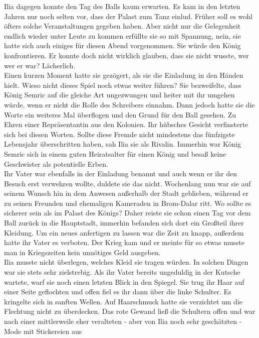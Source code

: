 Ilia dagegen konnte den Tag des Balls kaum erwarten. Es kam in den letzten Jahren nur noch selten 
vor, dass der Palast zum Tanz einlud. Früher soll es wohl öfters solche Veranstaltungen gegeben 
haben. Aber nicht nur die Gelegenheit endlich wieder unter Leute zu kommen erfüllte sie so mit 
Spannung, nein, sie hatte sich auch einiges für diesen Abend vorgenommen. Sie würde den König 
konfrontieren. Er konnte doch nicht wirklich glauben, dass sie nicht wusste, wer wer er war? 
Lächerlich.\\
Einen kurzen Moment hatte sie gezögert, als sie die Einladung in den Händen hielt. Wieso nicht 
dieses Spiel noch etwas weiter führen? Sie bezweifelte, dass König Semric auf die gleiche Art 
ungezwungen und heiter mit ihr umgehen würde, wenn er nicht die Rolle des Schreibers einnahm. Dann 
jedoch hatte sie die Worte ein weiteres Mal überflogen und den Grund für den Ball gesehen. Zu Ehren 
einer Repräsentantin aus den Kolonien. Ihr hübsches Gesicht verfinsterte sich bei diesen Worten. 
Sollte diese Fremde nicht mindestens das fünfzigste Lebensjahr überschritten haben, sah Ilia sie 
als Rivalin. Immerhin war König Semric sich in einem guten Heiratsalter für einen König und besaß 
keine Geschwister als potentielle Erben.\\
Ihr Vater war ebenfalls in der Einladung benannt und auch wenn er ihr den Besuch erst verwehren 
wollte, duldete sie das nicht. Wochenlang nun war sie auf seinem Wunsch hin in dem Anwesen 
außerhalb der Stadt geblieben, während er zu seinen Freunden und ehemaligen Kameraden in Brom-Dalar 
ritt. Wo sollte es sicherer sein als im Palast des Königs? Daher reiste sie schon einen Tag vor dem 
Ball zurück in die Hauptstadt, immerhin befanden sich dort ein Großteil ihrer Kleidung. Um ein 
neues anfertigen zu lassen war die Zeit zu knapp, außerdem hatte ihr Vater es verboten. Der Krieg 
kam und er meinte für so etwas musste man in Kriegszeiten kein unnötiges Geld ausgeben.\\
Ilia musste nicht überlegen, welches Kleid sie tragen würden. In solchen Dingen war sie stets sehr 
zielstrebig. Als ihr Vater bereits ungeduldig in der Kutsche wartete, warf sie noch einen letzten 
Blick in den Spiegel. Sie trug ihr Haar auf einer Seite geflochten und offen fiel es ihr dann über 
die linke Schulter. Es kringelte sich in sanften Wellen. Auf Haarschmuck hatte sie verzichtet um 
die Flechtung nicht zu überdecken. Das rote Gewand ließ die Schultern offen und war nach einer 
mittlerweile eher veralteten - aber von Ilia noch sehr geschätzten - Mode mit Stickereien aus 
